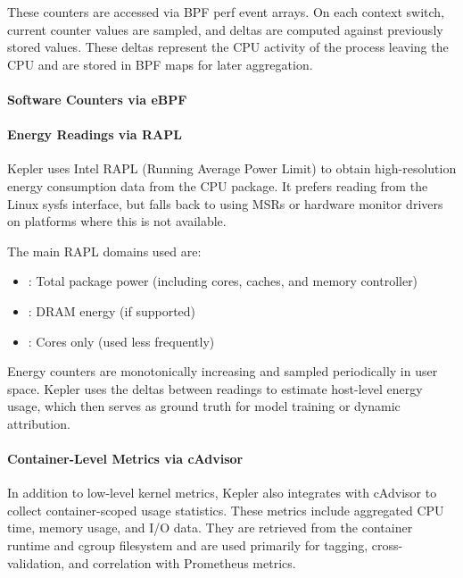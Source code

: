 These counters are accessed via BPF perf event arrays. On each context switch, current counter values are sampled, and deltas are computed against previously stored values. These deltas represent the CPU activity of the process leaving the CPU and are stored in BPF maps for later aggregation.

\paragraph{Software Counters via eBPF}






\paragraph{Energy Readings via RAPL}

Kepler uses Intel RAPL (Running Average Power Limit) to obtain high-resolution energy consumption data from the CPU package. It prefers reading from the Linux  sysfs interface, but falls back to using MSRs or hardware monitor drivers on platforms where this is not available.

The main RAPL domains used are:
\begin{itemize}
  \item {}: Total package power (including cores, caches, and memory controller)
  \item {}: DRAM energy (if supported)
  \item {}: Cores only (used less frequently)
\end{itemize}

Energy counters are monotonically increasing and sampled periodically in user space. Kepler uses the deltas between readings to estimate host-level energy usage, which then serves as ground truth for model training or dynamic attribution.







\paragraph{Container-Level Metrics via cAdvisor}

In addition to low-level kernel metrics, Kepler also integrates with cAdvisor to collect container-scoped usage statistics. These metrics include aggregated CPU time, memory usage, and I/O data. They are retrieved from the container runtime and cgroup filesystem and are used primarily for tagging, cross-validation, and correlation with Prometheus metrics.

